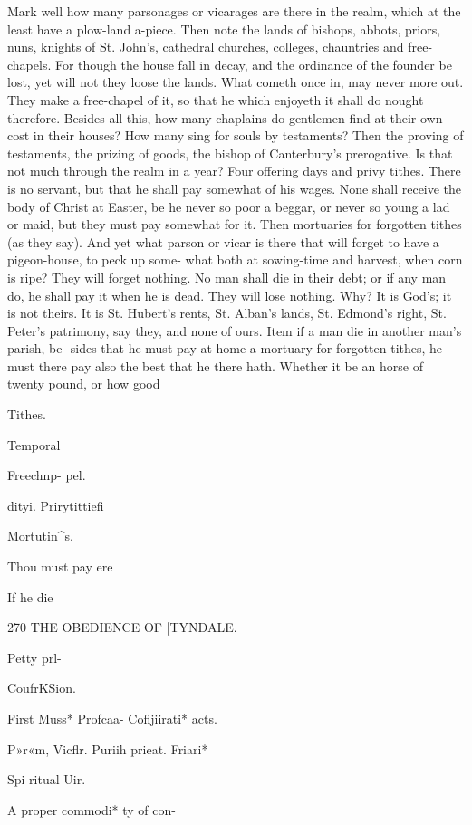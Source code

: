 \documentclass{custom}
\begin{document}
{Mark well how many parsonages or vicarages are there 
in the realm, which at the least have a plow-land a-piece. 
Then note the lands of bishops, abbots, priors, nuns, 
knights of St. John's, cathedral churches, colleges, 
chauntries and free-chapels. For though the house fall 
in decay, and the ordinance of the founder be lost, yet 
will not they loose the lands. What cometh once in, may 
never more out. They make a free-chapel of it, so that 
he which enjoyeth it shall do nought therefore. Besides 
all this, how many chaplains do gentlemen find at their 
own cost in their houses? How many sing for souls by 
testaments? Then the proving of testaments, the prizing 
of goods, the bishop of Canterbury's prerogative. Is that 
not much through the realm in a year? Four offering 
days and privy tithes. There is no servant, but that he 
shall pay somewhat of his wages. None shall receive 
the body of Christ at Easter, be he never so poor a 
beggar, or never so young a lad or maid, but they must 
pay somewhat for it. Then mortuaries for forgotten tithes 
(as they say). And yet what parson or vicar is there that 
will forget to have a pigeon-house, to peck up some- 
what both at sowing-time and harvest, when corn is ripe? 
They will forget nothing. No man shall die in their 
debt; or if any man do, he shall pay it when he is dead. 
They will lose nothing. Why? It is God's; it is not 
theirs. It is St. Hubert's rents, St. Alban's lands, St. 
Edmond's right, St. Peter's patrimony, say they, and none 
of ours. Item if a man die in another man's parish, be- 
sides that he must pay at home a mortuary for forgotten 
tithes, he must there pay also the best that he there hath. 
Whether it be an horse of twenty pound, or how good 

Tithes. 

Temporal 

Freechnp- 
pel. 

dityi. 
Prirytittiefi 

Mortutin^s. 

Thou must 
pay ere 

If he die 


270
THE OBEDIENCE OF
[TYNDALE.

Petty prl- 

CoufrKSion. 

First Muss* 
Profcaa- 
Cofijiirati* 
acts. 

P»r«m, 
Vicflr. 
Puriih 
prieat. 
Friari* 

Spi ritual 
Uir. 

A proper 
commodi* 
ty of con- 

}
\end{document}
